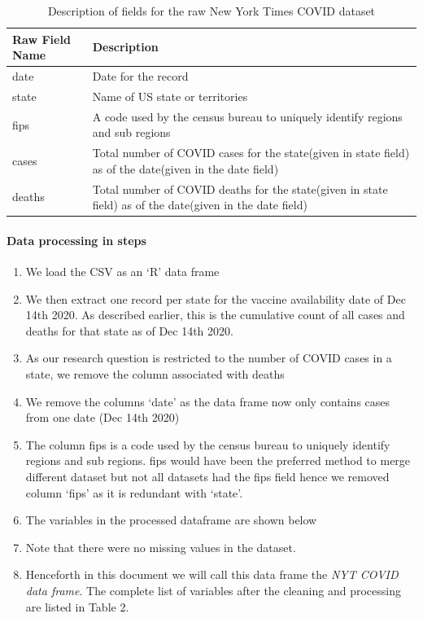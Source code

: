 \documentclass[
]{article}
\providecommand{\tightlist}{%
  \setlength{\itemsep}{0pt}\setlength{\parskip}{0pt}}
\begin{document}
\begin{table}[!h]

\caption{\label{tab:NYT_raw}Description of fields for the raw New York Times COVID dataset}
\centering
\begin{tabular}[t]{l|>{\raggedright\arraybackslash}p{6cm}}
\hline
Raw Field Name & Description\\
\hline
date & Date for the record\\
\hline
state & Name of US state or territories\\
\hline
fips & A code used by the census bureau to uniquely identify regions and sub regions\\
\hline
cases & Total number of COVID cases for the state(given  in state field) as of the date(given in the date field)\\
\hline
deaths & Total number of COVID deaths for the state(given  in state field) as of the date(given in the date field)\\
\hline
\end{tabular}
\end{table}

\hypertarget{data-processing-in-steps}{%
\paragraph{Data processing in steps}\label{data-processing-in-steps}}

\begin{enumerate}
\def\labelenumi{\arabic{enumi}.}
\tightlist
\item
  We load the CSV as an `R' data frame
\item
  We then extract one record per state for the vaccine availability date
  of Dec 14th 2020. As described earlier, this is the cumulative count
  of all cases and deaths for that state as of Dec 14th 2020.
\item
  As our research question is restricted to the number of COVID cases in
  a state, we remove the column associated with deaths
\item
  We remove the columns `date' as the data frame now only contains cases
  from one date (Dec 14th 2020)
\item
  The column fips is a code used by the census bureau to uniquely
  identify regions and sub regions. fips would have been the preferred
  method to merge different dataset but not all datasets had the fips
  field hence we removed column `fips' as it is redundant with `state'.
\item
  The variables in the processed dataframe are shown below
\item
  Note that there were no missing values in the dataset.
\item
  Henceforth in this document we will call this data frame the \emph{NYT
  COVID data frame}. The complete list of variables after the cleaning
  and processing are listed in Table 2.
\end{enumerate}
\end{document}

